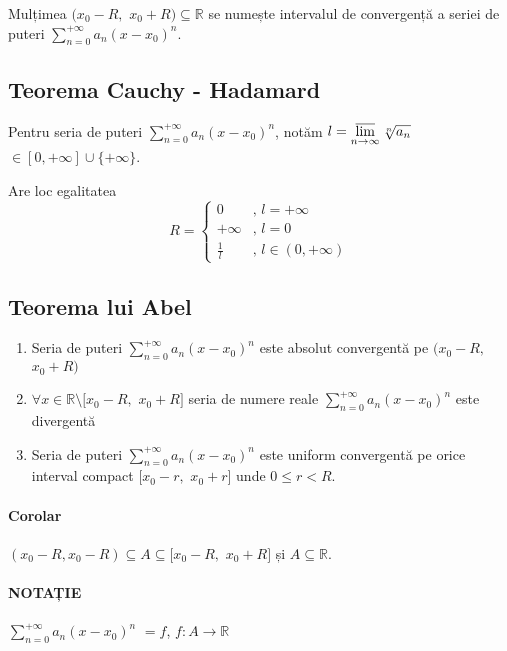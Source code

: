Mulțimea $(x_{0} - R,$ $x_{0} + R) \subseteq \mathbb{R}$ se numește intervalul de convergență a seriei de puteri $\displaystyle\sum_{n=0}^{+\infty}a_{n}(x-x_{0})^{n}$. 

\subsection{Teorema Cauchy - Hadamard}
Pentru seria  de puteri $\displaystyle\sum_{n=0}^{+\infty}a_{n}(x-x_{0})^{n}$, notăm $l = \displaystyle\varlimsup_{n \rightarrow \infty} \sqrt[n]{a_{n}}$ $\in [0, +\infty] \cup \{+\infty\}$.

\vspace{10pt}

Are loc egalitatea
\begin{equation*}
	R = \left\{
		\begin{array}{rl}
			0 & \text{, } l = +\infty \\
			+\infty & \text{, } l = 0 \\
			\frac{\displaystyle 1}{\displaystyle l} & \text{, } l \in (0, +\infty)
		\end{array} \right.
\end{equation*}

\subsection{Teorema lui Abel}
\begin{enumerate}[label=\emph{\alph*})]
	\item Seria de puteri $\displaystyle\sum_{n=0}^{+\infty}a_{n}(x-x_{0})^{n}$ este absolut convergentă pe $(x_{0} - R,$ $x_{0} + R)$
	\item $\forall x \in \mathbb{R} \setminus [x_{0} - R,$ $x_{0} + R]$ seria de numere reale $\displaystyle\sum_{n=0}^{+\infty}a_{n}(x-x_{0})^{n}$ este divergentă 
	\item Seria de puteri $\displaystyle\sum_{n=0}^{+\infty}a_{n}(x-x_{0})^{n}$ este uniform convergentă pe orice interval compact $[x_{0} - r,$ $x_{0} + r]$ unde $0 \leq r < R$.
\end{enumerate} 

\paragraph{Corolar}
$(x_{0} - R, x_{0} - R) \subseteq A \subseteq [x_{0} - R,$ $x_{0} + R]$ și $A \subseteq \mathbb{R}$.
\paragraph{NOTAȚIE}
$\displaystyle\sum_{n=0}^{+\infty}a_{n}(x-x_{0})^{n}$ $ = f$, $f: A \rightarrow \mathbb{R}$ 

